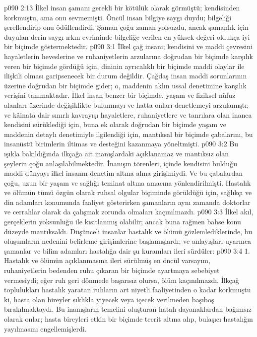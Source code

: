 \vs p090 2:13 İlkel insan şamanı gerekli bir kötülük olarak görmüştü; kendisinden korkmuştu, ama onu sevmemişti. Öncül insan bilgiye saygı duydu; bilgeliği şereflendirip onu ödüllendirdi. Şaman çoğu zaman yolsuzdu, ancak şamanlık için duyulan derin saygı ırkın evriminde bilgeliğe verilen en yüksek değeri oldukça iyi bir biçimde göstermektedir.
\vs p090 3:1 İlkel çağ insanı; kendisini ve maddi çevresini hayaletlerin heveslerine ve ruhaniyetlerin arzularına doğrudan bir biçimde karşılık veren bir biçimde gördüğü için, dininin ayrıcalıklı bir biçimde maddi olaylar ile ilişkili olması garipsenecek bir durum değildir. Çağdaş insan maddi sorunlarının üzerine doğrudan bir biçimde gider; o, maddenin aklın ussal denetimine karşılık verişini tanımaktadır. İlkel insan benzer bir biçimde, yaşam ve fiziksel nüfuz alanları üzerinde değişiklikte bulunmayı ve hatta onları denetlemeyi arzulamıştı; ve kâinata dair sınırlı kavrayışı hayaletlere, ruhaniyetlere ve tanrılara olan inanca kendisini sürüklediği için, buna ek olarak doğrudan bir biçimde yaşam ve maddenin detaylı denetimiyle ilgilendiği için, mantıksal bir biçimde çabalarını, bu insanüstü birimlerin iltimas ve desteğini kazanmaya yöneltmişti.
\vs p090 3:2 Bu ışıkla bakıldığında ilkçağa ait inanışlardaki açıklanamaz ve mantıksız olan şeylerin çoğu anlaşılabilmektedir. İnanışın törenleri, içinde kendisini bulduğu maddi dünyayı ilkel insanın denetim altına alma girişimiydi. Ve bu çabalardan çoğu, uzun bir yaşam ve sağlığı teminat altına amacına yönlendirilmişti. Hastalık ve ölümün tümü özgün olarak ruhsal olgular biçiminde görüldüğü için, sağlıkçı ve din adamları konumunda faaliyet gösterirken şamanların aynı zamanda doktorlar ve cerrahlar olarak da çalışmak zorunda olmaları kaçınılmazdı.
\vs p090 3:3 İlkel akıl, gerçeklerin yoksunluğu ile kısıtlanmış olabilir; ancak buna rağmen bahse konu düzeyde mantıksaldı. Düşünceli insanlar hastalık ve ölümü gözlemlediklerinde, bu oluşumların nedenini belirleme girişimlerine başlamışlardı; ve anlayışları uyarınca şamanlar ve bilim adamları hastalığa dair şu kuramları ileri sürdüler:
\vs p090 3:4 1.\bibnobreakspace {} Hastalık ve ölümün açıklanmasına ileri sürülmüş en öncül varsayım, ruhaniyetlerin bedenden ruhu çıkaran bir biçimde ayartmaya sebebiyet vermesiydi; eğer ruh geri dönmede başarısız olursa, ölüm kaçınılmazdı. İlkçağ toplulukları hastalık yaratan ruhların art niyetli faaliyetinden o kadar korkmuştu ki, hasta olan bireyler sıklıkla yiyecek veya içecek verilmeden başıboş bırakılmaktaydı. Bu inanışların temelini oluşturan hatalı dayanaklardan bağımsız olarak onlar; hasta bireyleri etkin bir biçimde tecrit altına alıp, bulaşıcı hastalığın yayılmasını engellemişlerdi.
